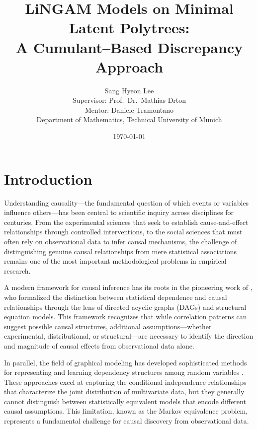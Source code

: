 \documentclass[11pt,a4paper]{article}
\title{LiNGAM Models on Minimal Latent Polytrees:\\A Cumulant--Based Discrepancy Approach}
\author{Sang Hyeon Lee\\
  \small Supervisor: Prof.~Dr.~Mathias Drton\\
  \small Mentor: Daniele Tramontano\\[1ex]
  \small Department of Mathematics, Technical University of Munich}
\date{\today}
\numberwithin{equation}{section}
\begin{document}


\setcounter{page}{2}







\tableofcontents

\pagestyle{fancy}

\section{Introduction}
\label{sec:intro}
Understanding causality—the fundamental question of which events or variables influence others—has been central to scientific inquiry across disciplines for centuries. From the experimental sciences that seek to establish cause-and-effect relationships through controlled interventions, to the social sciences that must often rely on observational data to infer causal mechanisms, the challenge of distinguishing genuine causal relationships from mere statistical associations remains one of the most important methodological problems in empirical research.

A modern framework for causal inference has its roots in the pioneering work of \citet{pearl:causality:2009}, who formalized the distinction between statistical dependence and causal relationships through the lens of directed acyclic graphs (DAGs) and structural equation models. This framework recognizes that while correlation patterns can suggest possible causal structures, additional assumptions—whether experimental, distributional, or structural—are necessary to identify the direction and magnitude of causal effects from observational data alone.

In parallel, the field of graphical modeling has developed sophisticated methods for representing and learning dependency structures among random variables \citep{lauritzen:graphical:1996, Edwards:intro:2000}. These approaches excel at capturing the conditional independence relationships that characterize the joint distribution of multivariate data, but they generally cannot distinguish between statistically equivalent models that encode different causal assumptions. This limitation, known as the Markov equivalence problem, represents a fundamental challenge for causal discovery from observational data.
\end{document}
